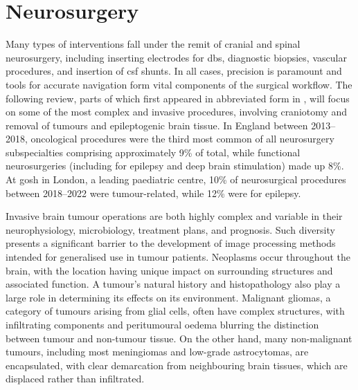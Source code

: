
\chapter{Neurosurgery}\label{chap:neurosurgery}


Many types of interventions fall under the remit of cranial and spinal neurosurgery, including inserting electrodes for \gls{dbs}, diagnostic biopsies, vascular procedures, and insertion of \gls{csf} shunts.
In all cases, precision is paramount and tools for accurate navigation form vital components of the surgical workflow.
The following review, parts of which first appeared in abbreviated form in \textcite{Young2024}, will focus on some of the most complex and invasive procedures, involving craniotomy and removal of tumours and epileptogenic brain tissue.
In England between 2013--2018, oncological procedures were the third most common of all neurosurgery subspecialties comprising approximately 9\% of total, while functional neurosurgeries (including for epilepsy and deep brain stimulation) made up 8\%\autocite{Wahba2022}.
At \gls{gosh} in London, a leading paediatric centre, 10\% of neurosurgical procedures between 2018--2022 were tumour-related, while 12\% were for epilepsy\autocite{gosh2023}.

Invasive brain tumour operations are both highly complex and variable in their neurophysiology, microbiology, treatment plans, and prognosis.
Such diversity presents a significant barrier to the development of image processing methods intended for generalised use in tumour patients\autocite{Bauer2013}.
Neoplasms occur throughout the brain, with the location having unique impact on surrounding structures and associated function.
A tumour's natural history and histopathology also play a large role in determining its effects on its environment.
Malignant gliomas, a category of tumours arising from glial cells, often have complex structures, with infiltrating components and peritumoural oedema blurring the distinction between tumour and non-tumour tissue\autocite{Weller2021}.
On the other hand, many non-malignant tumours, including most meningiomas and low-grade astrocytomas, are encapsulated, with clear demarcation from neighbouring brain tissues, which are displaced rather than infiltrated\autocite{Lu2004,Gerard2017}.

